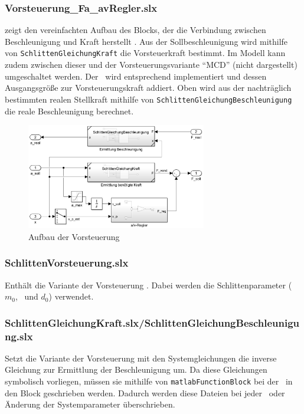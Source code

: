\subsubsection{Vorsteuerung\_Fa\_avRegler.slx}
 zeigt den vereinfachten Aufbau des Blocks, der die Verbindung zwischen Beschleunigung und Kraft herstellt .
Aus der Sollbeschleunigung wird mithilfe von \texttt{SchlittenGleichungKraft} die Vorsteuerkraft bestimmt.
Im Modell kann zudem zwischen dieser und der Vorsteuerungsvariante "`MCD"' (nicht dargestellt) umgeschaltet werden.
Der \avr\ wird entsprechend  implementiert und dessen Ausgangsgröße zur Vorsteuerungskraft addiert.
Oben wird aus der nachträglich bestimmten realen Stellkraft mithilfe von \texttt{SchlittenGleichungBeschleunigung} die reale Beschleunigung berechnet.

\begin{figure}[htb]
	\centering
		\includegraphics[width=0.7\textwidth]{Bilder/Simulink/Fa_vorst.PNG}
	\caption{Aufbau der Vorsteuerung}
	\label{fig:simfav}
\end{figure}

\subsubsection{SchlittenVorsteuerung.slx}
Enthält die  Variante der Vorsteuerung .
Dabei werden die Schlittenparameter ($m_0$, \Fco\ und $d_0$) verwendet. 

\subsubsection{SchlittenGleichungKraft.slx/SchlittenGleichungBeschleunigung.slx}
Setzt die Variante der Vorsteuerung mit den Systemgleichungen  \bzw die inverse Gleichung zur Ermittlung der Beschleunigung um.
Da diese Gleichungen symbolisch vorliegen, müssen sie mithilfe von \texttt{matlabFunctionBlock} bei der \init\ in den Block geschrieben werden.
Dadurch werden diese Dateien bei jeder \init\ oder Änderung der Systemparameter überschrieben.

